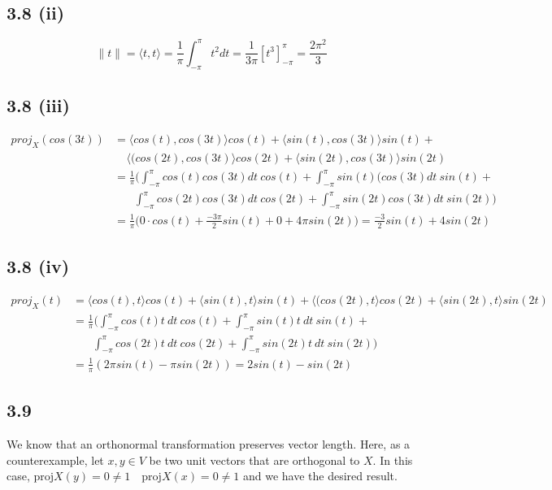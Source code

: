 \documentclass[letterpaper,12pt]{article}
\theoremstyle{definition}
\begin{document}
\subsection*{3.8 (ii)}
\[\|t\| = \langle  t,t \rangle   = \frac{1}{\pi}\int_{-\pi}^{\pi}t^2dt = \frac{1}{3\pi}[t^3]^\pi_{-\pi}=\frac{2\pi^2}{3}\]
\subsection*{3.8 (iii)}
\begin{align*}
proj_X(cos(3t)) &= \langle  cos(t),cos(3t)\rangle   cos(t)+\langle  sin(t),cos(3t)\rangle   sin(t)+\\ 
&~~~~~\langle  (cos(2t),cos(3t)\rangle   cos(2t) +\langle  sin(2t),cos(3t)\rangle   sin(2t)\\
&=\frac{1}{\pi}\bigg(\int^\pi_{-\pi}cos(t)cos(3t)dt ~cos(t)+\int^\pi_{-\pi}sin(t)(cos(3t)dt ~sin(t)+\\ 
&~~~~~~~~\int^\pi_{-\pi}cos(2t)cos(3t)dt~cos(2t)+ \int^\pi_{-\pi}sin(2t)cos(3t)dt~sin(2t)\bigg)\\
&=\frac{1}{\pi}\big(0 \cdot cos(t)+\frac{-3\pi}{2}sin(t)+0+4\pi sin(2t)\big)=\frac{-3}{2}sin(t)+ 4sin(2t)
\end{align*}
\subsection*{3.8 (iv)}
\begin{align*}
proj_{X}(t) &= \langle cos(t),t\rangle cos(t)+\langle  sin(t),t\rangle sin(t) + \langle  (cos(2t),t\rangle   cos(2t) +\langle  sin(2t),t\rangle   sin(2t)\\
&=\frac{1}{\pi}\bigg(\int^\pi_{-\pi}cos(t)t~dt ~cos(t)+\int^\pi_{-\pi}sin(t)t~dt ~sin(t)+\\ 
&~~~~~~~~\int^\pi_{-\pi}cos(2t)t~dt~cos(2t)+ \int^\pi_{-\pi}sin(2t)t~dt~sin(2t)\bigg) \\
&=\frac{1}{\pi}(2\pi sin(t)-\pi sin(2t))=2sin(t)-sin(2t)
\end{align*}

\subsection*{3.9}

We know that an orthonormal transformation preserves vector length. Here, as a counterexample, let $x,y \in V$ be two unit vectors that are orthogonal to $X$. In this case, $\text{proj}X(y)= 0 \neq 1 \quad \text{proj}X(x)= 0 \neq 1 $ and we have the desired result. 
\end{document}
